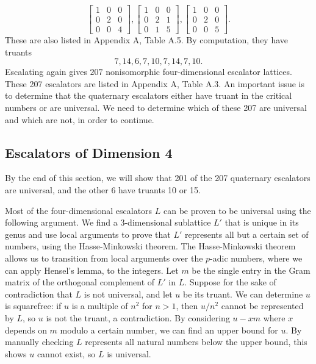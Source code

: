 \documentclass[letterpaper, 12pt]{article}
\begin{document}
\[\begin{bmatrix} 1 & 0 & 0 \\ 0 & 2 & 0 \\ 0 & 0 & 4 \end{bmatrix}, \begin{bmatrix} 1 & 0 & 0 \\ 0 & 2 & 1 \\ 0 & 1 & 5 \end{bmatrix}, \begin{bmatrix} 1 & 0 & 0 \\ 0 & 2 & 0 \\ 0 & 0 & 5 \end{bmatrix}.\]
These are also listed in Appendix A, Table A.5.
By computation, they have truants
\[7, 14, 6, 7, 10, 7, 14, 7, 10.\]
Escalating again gives $207$ nonisomorphic four-dimensional escalator lattices. These 207 escalators are listed in Appendix A, Table A.3. An important issue is to determine that the quaternary escalators either have truant in the critical numbers or are universal. We need to determine which of these 207 are universal and which are not, in order to continue.

\subsection{Escalators of Dimension 4}
By the end of this section, we will show that 201 of the 207 quaternary escalators are universal, and the other 6 have truants 10 or 15.

Most of the four-dimensional escalators $L$ can be proven to be universal using the following argument.
We find a $3$-dimensional sublattice $L'$ that is unique in its genus and use local arguments to prove that $L'$ represents all but a certain set of numbers, using the Hasse-Minkowski theorem. The Hasse-Minkowski theorem allows us to transition from local arguments over the $p$-adic numbers, where we can apply Hensel's lemma, to the integers.
Let $m$ be the single entry in the Gram matrix of the orthogonal complement of $L'$ in $L$.
Suppose for the sake of contradiction that $L$ is not universal, and let $u$ be its truant.
We can determine $u$ is squarefree: if $u$ is a multiple of $n^2$ for $n > 1$, then $u/n^2$ cannot be represented by $L$, so $u$ is not the truant, a contradiction. By considering $u - xm$ where $x$ depends on $m$ modulo a certain number, we can find an upper bound for $u$.
By manually checking $L$ represents all natural numbers below the upper bound, this shows $u$ cannot exist, so $L$ is universal.
\end{document}
